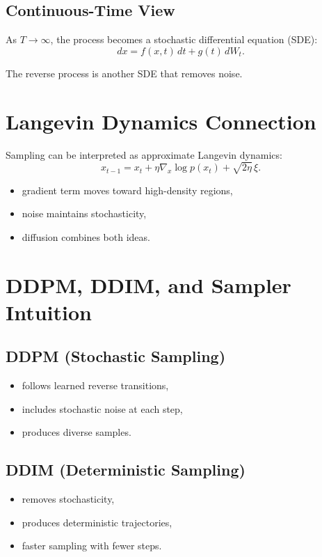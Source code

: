 \subsection{Continuous-Time View}

As $T \to \infty$, the process becomes a stochastic differential equation (SDE):
\[
dx = f(x,t)\,dt + g(t)\,dW_t.
\]

The reverse process is another SDE that removes noise.

\section{Langevin Dynamics Connection}

Sampling can be interpreted as approximate Langevin dynamics:
\[
x_{t-1} = x_t + \eta \nabla_x \log p(x_t) + \sqrt{2\eta}\,\xi.
\]

\begin{itemize}
    \item gradient term moves toward high-density regions,
    \item noise maintains stochasticity,
    \item diffusion combines both ideas.
\end{itemize}

\section{DDPM, DDIM, and Sampler Intuition}

\subsection{DDPM (Stochastic Sampling)}

\begin{itemize}
    \item follows learned reverse transitions,
    \item includes stochastic noise at each step,
    \item produces diverse samples.
\end{itemize}

\subsection{DDIM (Deterministic Sampling)}

\begin{itemize}
    \item removes stochasticity,
    \item produces deterministic trajectories,
    \item faster sampling with fewer steps.
\end{itemize}

